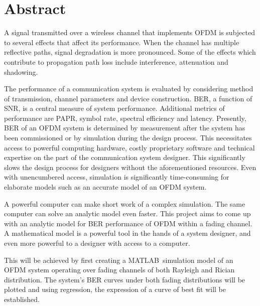 \chapter*{Abstract}
A signal transmitted over a wireless channel that implements \gls{OFDM} is subjected to several effects that affect its performance. When the channel has multiple reflective paths, signal degradation is more pronounced. Some of the effects which contribute to propagation path loss include interference, attenuation and shadowing.

The performance of a communication system is evaluated by considering method of transmission, channel parameters and device construction. \gls{BER}, a function of \gls{SNR}, is a central measure of system performance. Additional metrics of performance are \gls{PAPR}, symbol rate, spectral efficiency and latency. Presently, \gls{BER} of an \gls{OFDM} system is determined by measurement after the system has been commissioned or by simulation during the design process. This necessitates access to powerful computing hardware, costly proprietary software and technical expertise on the part of the communication system designer. This significantly slows the design process for designers without the aforementioned resources. Even with unencumbered access, simulation is significantly time-consuming for elaborate models such as an accurate model of an \gls{OFDM} system.


A powerful computer can make short work of a complex simulation. The same computer can solve an analytic model even faster. This project aims to come up with an analytic model for \gls{BER} performance of \gls{OFDM}  within a fading channel. A mathematical model is a powerful tool in the hands of a system designer, and even more powerful to a designer with access to a computer.

This will be achieved by first creating a MATLAB\textcopyright\ simulation model of an \gls{OFDM} system operating over fading channels of both Rayleigh and Rician distribution. The system's \gls{BER} curves under both fading distributions will be plotted and using regression, the expression of a curve of best fit will be established. 
